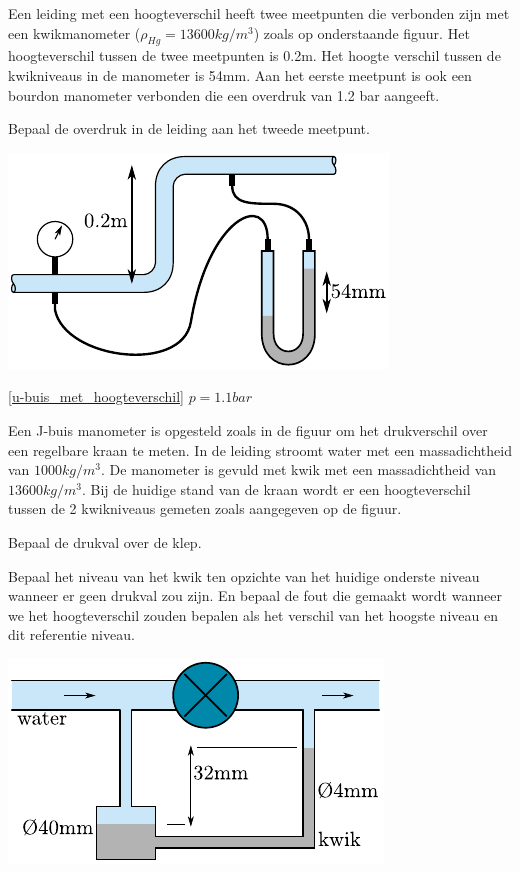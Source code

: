 \begin{toepassing}[*]
	\label{u-buis_met_hoogteverschil}
Een leiding met een hoogteverschil heeft twee meetpunten die verbonden zijn met een kwikmanometer ($\rho_{Hg}=13600kg/m^3$) zoals op onderstaande figuur. Het hoogteverschil tussen de twee meetpunten is 0.2m. Het hoogte verschil tussen de kwikniveaus in de manometer is 54mm. Aan het eerste meetpunt is ook een bourdon manometer verbonden die een overdruk van 1.2 bar aangeeft.
		
Bepaal de overdruk in de leiding aan het tweede meetpunt.

	\centering
	\includegraphics{fig/hydrostatica/u-buis_met_hoogteverschil}
\end{toepassing}
\begin{antwoord}{\ref{u-buis_met_hoogteverschil}}
	$p = 1.1\unit{bar}$
\end{antwoord}
\begin{toepassing}
	\label{J-buis}
Een J-buis manometer is opgesteld zoals in de figuur om het drukverschil over een regelbare kraan te meten. In de leiding stroomt water met een massadichtheid van $1000kg/m^3$. De manometer is gevuld met kwik met een massadichtheid van $13600kg/m^3$. Bij de huidige stand van de kraan wordt er een hoogteverschil tussen de 2 kwikniveaus gemeten zoals aangegeven op de figuur.
		
Bepaal de drukval over de klep.
		
Bepaal het niveau van het kwik ten opzichte van het huidige onderste niveau wanneer er geen drukval zou zijn. En bepaal de fout die gemaakt wordt wanneer we het hoogteverschil zouden bepalen als het verschil van het hoogste niveau en dit referentie niveau.

	\centering
	\includegraphics{fig/hydrostatica/J-buis}
\end{toepassing}
